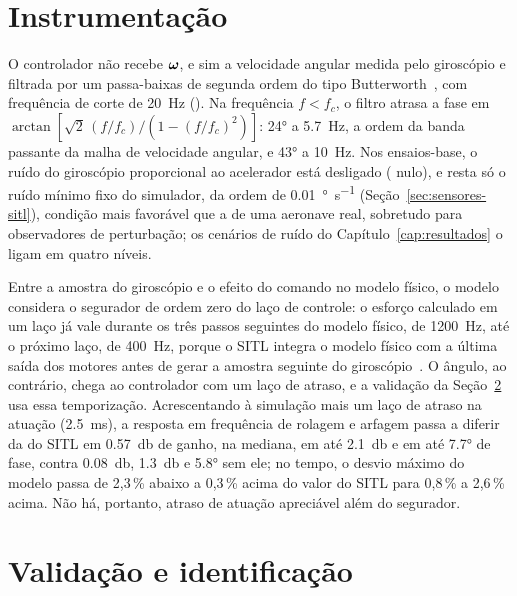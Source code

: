 \section{Instrumentação}
\label{sec:instrumentacao}

O controlador não recebe $\bm{\omega}$, e sim a velocidade angular medida
pelo giroscópio e filtrada por um passa-baixas de segunda ordem do tipo
Butterworth~\cite{butterworth1930}, com frequência de corte de
\SI{20}{\hertz} (). Na frequência $f < f_c$, o
filtro atrasa a fase em
$\arctan\!\left[\sqrt{2}\,(f/f_c)\big/\left(1 - (f/f_c)^2\right)\right]$:
\ang{24} a \SI{5.7}{\hertz}, a ordem da banda passante da malha de
velocidade angular, e \ang{43} a \SI{10}{\hertz}. Nos ensaios-base, o ruído
do giroscópio proporcional ao acelerador está desligado
( nulo), e resta só o ruído mínimo fixo do simulador,
da ordem de \SI{0.01}{\degree\per\second} (Seção~\ref{sec:sensores-sitl}),
condição mais favorável que a de uma aeronave real, sobretudo para
observadores de perturbação; os cenários de ruído do
Capítulo~\ref{cap:resultados} o ligam em quatro níveis.

Entre a amostra do giroscópio e o efeito do comando no modelo físico, o modelo
considera o segurador de ordem zero do laço de controle: o esforço calculado
em um laço já vale durante os três passos seguintes do modelo físico, de
\SI{1200}{\hertz}, até o próximo laço, de \SI{400}{\hertz}, porque o SITL
integra o modelo físico com a última saída dos motores antes de gerar a
amostra seguinte do giroscópio~\cite{ardupilot2026}. O ângulo, ao contrário,
chega ao controlador com um laço de atraso, e a validação da
Seção~\ref{sec:validacao-identificacao} usa essa temporização. Acrescentando
à simulação mais um laço de atraso na atuação (\SI{2.5}{\milli\second}), a
resposta em frequência de rolagem e arfagem passa a diferir da do SITL em
\SI{0.57}{\decibel} de ganho, na mediana, em até
\SI{2.1}{\decibel} e em até \ang{7.7} de fase,
contra \SI{0.08}{\decibel}, \SI{1.3}{\decibel} e \ang{5.8} sem ele; no tempo, o desvio máximo do modelo passa de 2,3\,\% abaixo
a 0,3\,\% acima do valor do SITL para 0,8\,\% a 2,6\,\% acima. Não há,
portanto, atraso de atuação apreciável além do segurador.

\section{Validação e identificação}
\label{sec:validacao-identificacao}

